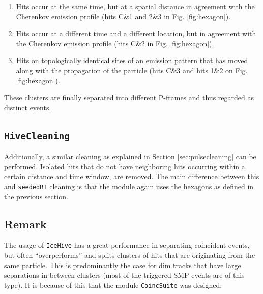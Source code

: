 \begin{enumerate}
\item Hits occur at the same time, but at a spatial distance in agreement with the Cherenkov emission profile (hits C\&1 and 2\&3 in Fig. \ref{fig:hexagon}).
\item Hits occur at a different time and a different location, but in agreement with the Cherenkov emission profile (hits C\&2 in Fig. \ref{fig:hexagon}).
\item Hits on topologically identical sites of an emission pattern that has moved along with the propagation of the particle (hits C\&3 and hits 1\&2 on Fig. \ref{fig:hexagon}).
\end{enumerate}
These clusters are finally separated into different P-frames and thus regarded as distinct events.

\subsection{\texttt{HiveCleaning}}
Additionally, a similar cleaning as explained in Section \ref{sec:pulsecleaning} can be performed. Isolated hits that do not have neighboring hits occurring within a certain distance and time window, are removed. The main difference between this and \texttt{seededRT} cleaning is that the module again uses the hexagons as defined in the previous section.\\

\subsection{Remark}
\noindent The usage of \texttt{IceHive} has a great performance in separating coincident events, but often ``overperforms'' and splits clusters of hits that are originating from the same particle. This is predominantly the case for dim tracks that have large separations in between clusters (most of the triggered SMP events are of this type). It is because of this that the module \texttt{CoincSuite}  was designed.

